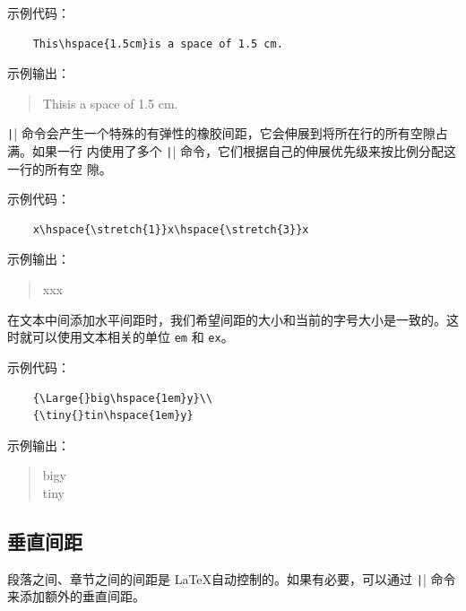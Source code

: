 \documentclass[UTF8]{ctexart}
\begin{document}
示例代码：
\begin{verbatim}
    This\hspace{1.5cm}is a space of 1.5 cm.
\end{verbatim}

示例输出：
\begin{quote}
    This\hspace{1.5cm}is a space of 1.5 cm.
\end{quote}

\texttt|| 命令会产生一个特殊的有弹性的橡胶间距，它会伸展到将所在行的所有空隙占满。如果一行
内使用了多个 \texttt|| 命令，它们根据自己的伸展优先级来按比例分配这一行的所有空
隙。

示例代码：
\begin{verbatim}
    x\hspace{\stretch{1}}x\hspace{\stretch{3}}x
\end{verbatim}

示例输出：
\begin{quote}
    xxx
\end{quote}

在文本中间添加水平间距时，我们希望间距的大小和当前的字号大小是一致的。这时就可以使用文本相关的单位 \texttt{em} 和
\texttt{ex}。

示例代码：
\begin{verbatim}
    {\Large{}big\hspace{1em}y}\\
    {\tiny{}tin\hspace{1em}y}
\end{verbatim}

示例输出：
\begin{quote}
    {\Large{}big\hspace{1em}y}\\
    {\tiny{}tin\hspace{1em}y}
\end{quote}

\subsection{垂直间距}
段落之间、章节之间的间距是 \LaTeX 自动控制的。如果有必要，可以通过 \texttt|\vspace{length}| 命令
来添加额外的垂直间距。
\end{document}

